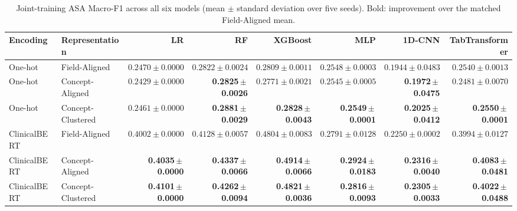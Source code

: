 \begin{table}[!t]
\caption{Joint-training ASA Macro-F1 across all six models (mean $\pm$ standard deviation over five seeds). Bold: improvement over the matched Field-Aligned mean.}
\label{tab:joint-all}
\centering\footnotesize
\setlength{\tabcolsep}{2.4pt}
\begin{tabular}{llrrrrrr}
\toprule
Encoding & Representation & LR & RF & XGBoost & MLP & 1D-CNN & TabTransformer \\
\midrule
One-hot & Field-Aligned & $0.2470\pm0.0000$ & $0.2822\pm0.0024$ & $0.2809\pm0.0011$ & $0.2548\pm0.0003$ & $0.1944\pm0.0483$ & $0.2540\pm0.0013$ \\
One-hot & Concept-Aligned & $0.2429\pm0.0000$ & \textbf{0.2825}\,$\pm$\,\textbf{0.0026} & $0.2771\pm0.0021$ & $0.2545\pm0.0005$ & \textbf{0.1972}\,$\pm$\,\textbf{0.0475} & $0.2481\pm0.0070$ \\
One-hot & Concept-Clustered & $0.2461\pm0.0000$ & \textbf{0.2881}\,$\pm$\,\textbf{0.0029} & \textbf{0.2828}\,$\pm$\,\textbf{0.0043} & \textbf{0.2549}\,$\pm$\,\textbf{0.0001} & \textbf{0.2025}\,$\pm$\,\textbf{0.0412} & \textbf{0.2550}\,$\pm$\,\textbf{0.0001} \\
ClinicalBERT & Field-Aligned & $0.4002\pm0.0000$ & $0.4128\pm0.0057$ & $0.4804\pm0.0083$ & $0.2791\pm0.0128$ & $0.2250\pm0.0002$ & $0.3994\pm0.0127$ \\
ClinicalBERT & Concept-Aligned & \textbf{0.4035}\,$\pm$\,\textbf{0.0000} & \textbf{0.4337}\,$\pm$\,\textbf{0.0066} & \textbf{0.4914}\,$\pm$\,\textbf{0.0066} & \textbf{0.2924}\,$\pm$\,\textbf{0.0183} & \textbf{0.2316}\,$\pm$\,\textbf{0.0040} & \textbf{0.4083}\,$\pm$\,\textbf{0.0481} \\
ClinicalBERT & Concept-Clustered & \textbf{0.4101}\,$\pm$\,\textbf{0.0000} & \textbf{0.4262}\,$\pm$\,\textbf{0.0094} & \textbf{0.4821}\,$\pm$\,\textbf{0.0036} & \textbf{0.2816}\,$\pm$\,\textbf{0.0093} & \textbf{0.2305}\,$\pm$\,\textbf{0.0033} & \textbf{0.4022}\,$\pm$\,\textbf{0.0488} \\
\bottomrule
\end{tabular}
\end{table}
